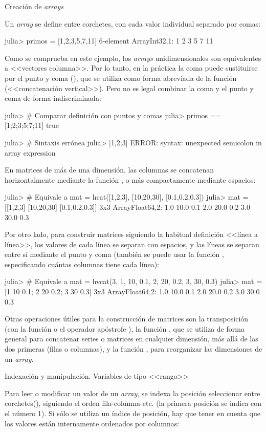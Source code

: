 ﻿\documentclass[spanish]{article}
\begin{document}
Creación de \emph{arrays}

Un \emph{array} se define entre corchetes, con cada valor individual
separado por comas:

julia> primos = [1,2,3,5,7,11]
6-element Array{Int32,1}:
 1
 2
 3
 5
 7
 11

Como se comprueba en este ejemplo, los \emph{arrays} unidimensionales
son equivalentes a <<vectores columna>>. Por lo tanto, en la práctica
la coma puede sustituirse por el punto y coma (\codet{;}), que
se utiliza como forma abreviada de la función  (<<concatenación
vertical>>). Pero no es legal combinar la coma y el punto y coma
de forma indiscriminada:

julia> # Comparar definición con puntos y comas
julia> primos == {[}1;2;3;5;7;11{]}
true

julia> \# Sintaxis errónea
julia> {[}1,2;3{]}
ERROR: syntax: unexpected semicolon in array expression

En matrices de más de una dimensión, las columnas se concatenan horizontalmente
mediante la función , o más compactamente mediante espacios:

julia> \# Equivale a mat = hcat({[}1,2,3{]}, {[}10,20,30{]}, {[}0.1,0.2,0.3{]})
julia> mat = {[}{[}1,2,3{]} {[}10,20,30{]} {[}0.1,0.2,0.3{]}{]}
3x3 Array{Float64,2}:
 1.0 10.0 0.1
 2.0 20.0 0.2
 3.0 30.0 0.3

Por otro lado, para construir matrices siguiendo la habitual definición
<<línea a línea>>, los valores de cada línea se separan con espacios,
y las líneas se separan entre sí mediante el punto y coma (también
se puede usar la función , especificando cuántas columnas
tiene cada línea):

julia> \# Equivale a mat = hvcat(3, 1, 10, 0.1, 2, 20, 0.2, 3, 30, 0.3)
julia> mat = {[}1 10 0.1; 2 20 0.2; 3 30 0.3{]}
3x3 Array{Float64,2}:
 1.0 10.0 0.1
 2.0 20.0 0.2
 3.0 30.0 0.3

Otras operaciones útiles para la construcción de matrices son la transposición
(con la función  o el operador apóstrofe ),
la función , que se utiliza de forma general para concatenar
series o matrices en cualquier dimensión, más allá de las dos primeras
(filas o columnas), y la función , para reorganizar
las dimensiones de un \emph{array}.

Indexación y manipulación. Variables de tipo <<rango>>

Para leer o modificar un valor de un \emph{array}, se indexa la posición
seleccionar entre corchetes(\code{{[}{]}}), siguiendo el orden fila-columna-etc.
(la primera posición se indica con el número 1). Si sólo se utiliza
un índice de posición, hay que tener en cuenta que los valores están
internamente ordenados por columnas:
\end{document}

